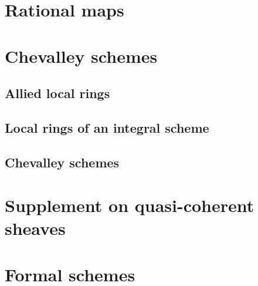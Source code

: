 \documentclass[10pt,oneside]{amsart}
\begin{document}
    \section{Rational maps}

    \section{Chevalley schemes}

        \subsection{Allied local rings}
        

        \subsection{Local rings of an integral scheme}
        

        \subsection{Chevalley schemes}
        

    \section{Supplement on quasi-coherent sheaves}

    \section{Formal schemes}
\end{document}

